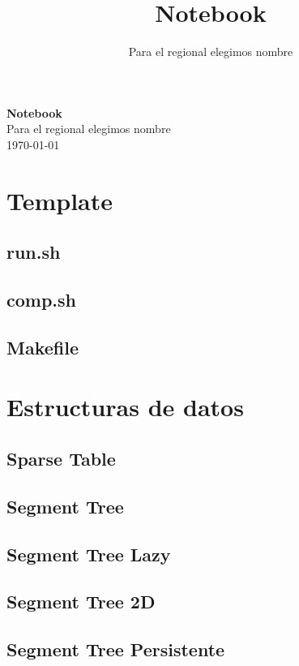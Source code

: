 \documentclass[a4paper,11pt,landscape,twocolumn]{article}
\title{Notebook}
\author{Para el regional elegimos nombre}
\begin{document}
\begin{center}
    \LARGE\textbf{Notebook}\\[1em]
    \large Para el regional elegimos nombre\\[1em]
    \normalsize \today\\[1em]
\end{center}

\tableofcontents
\newpage
\section{Template} %

\subsection{run.sh}

\subsection{comp.sh}

\subsection{Makefile}


\section{Estructuras de datos} %
\subsection{Sparse Table}

\subsection{Segment Tree}

\subsection{Segment Tree Lazy}

\subsection{Segment Tree 2D}

\subsection{Segment Tree Persistente}

\end{document}
